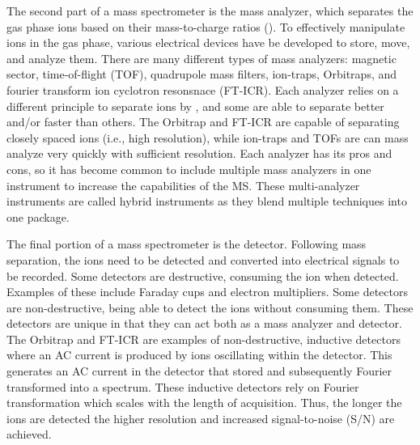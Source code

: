 The second part of a mass spectrometer is the mass analyzer, which separates the gas phase ions based on their mass-to-charge ratios (\mz{}). To effectively manipulate ions in the gas phase, various electrical devices have be developed to store, move, and analyze them. There are many different types of mass analyzers: magnetic sector, time-of-flight (TOF)\cite{tof}, quadrupole mass filters\cite{iontrap}, ion-traps\cite{iontrap2}, Orbitraps\cite{orbitrap}, and fourier transform ion cyclotron resonsnace (FT-ICR)\cite{fticr}. Each analyzer relies on a different principle to separate ions by \mz{}, and some are able to separate better and/or faster than others. The Orbitrap and FT-ICR are capable of separating closely spaced \mz{} ions (i.e., high resolution), while ion-traps and TOFs are can mass analyze very quickly with sufficient resolution. Each analyzer has its pros and cons, so it has become common to include multiple mass analyzers in one instrument to increase the capabilities of the MS. These multi-analyzer instruments are called hybrid instruments as they blend multiple techniques into one package.

The final portion of a mass spectrometer is the detector. Following mass separation, the ions need to be detected and converted into electrical signals to be recorded. Some detectors are destructive, consuming the ion when detected. Examples of these include Faraday cups and electron multipliers. Some detectors are non-destructive, being able to detect the ions without consuming them. These detectors are unique in that they can act both as a mass analyzer and detector. The Orbitrap and FT-ICR are examples of non-destructive, inductive detectors where an AC current is produced by ions oscillating within the detector. This generates an AC current in the detector that stored and subsequently Fourier transformed into a \mz{} spectrum. These inductive detectors rely on Fourier transformation which scales with the length of acquisition. Thus, the longer the ions are detected the higher resolution and increased signal-to-noise (S/N) are achieved.

